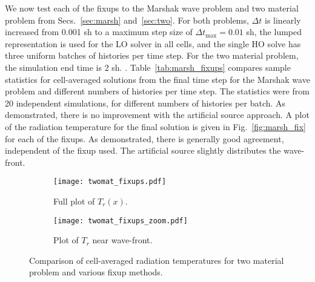 We now test each of the fixups to the Marshak wave problem and two material problem from
Secs.~\ref{sec:marsh} and~\ref{sec:two}. For both problems, $\Delta t$ is
linearly increased from 0.001 sh to a maximum step size of $\Delta t_{\max} = 0.01$ sh,
the lumped representation is used for the LO solver in all cells, and the single HO solve
has three uniform batches of histories per time step.
For the two material problem, the simulation end time is 2 sh.  .  Table~\ref{tab:marsh_fixups} compares sample statistics for cell-averaged
solutions from the final time step for the Marshak wave problem and different numbers of
histories per time step.  The statistics were from 20 independent simulations, for different numbers
of histories per batch.  As demonstrated, there is no improvement with the artificial
source approach.  A plot of the radiation temperature for the final solution is given in
Fig.~\ref{fig:marsh_fix} for each of the fixups.  As demonstrated, there is generally good
agreement, independent of the fixup used.  The artificial source slightly distributes the
wave-front. 

\begin{figure}
\begin{subfigure}{0.7\textwidth}
  \centering
    \texttt{[image: twomat\_fixups.pdf]}
    \caption{\label{fig:twomat_fix_full} Full plot of $T_r(x)$.}
\end{subfigure}
\begin{subfigure}{0.7\textwidth}
  \centering
  \texttt{[image: twomat\_fixups\_zoom.pdf]}
  \caption{\label{fig:twomat_fix_zoom} Plot of $T_r$ near wave-front.}
\end{subfigure}
    \centering
    \caption{\label{fig:twomat_fix}Comparison of cell-averaged radiation temperatures for
two material problem and various fixup methods.}
\end{figure}



